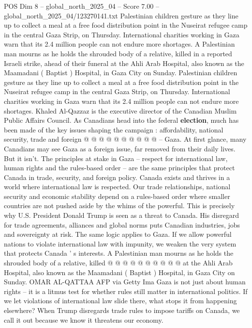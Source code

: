 \begin{textsample}{POS Dim 8 – global\_north\_2025\_04 – Score 7.00 – global\_north\_2025\_04/123270141.txt}  \label{ex:f8_pos_375}
Palestinian children gesture as they line up to collect a meal at a free food distribution point in the Nuseirat refugee camp in the central Gaza Strip, on Thursday.
International charities working in Gaza warn that its 2.4 million people can not endure more shortages.
A Palestinian man mourns as he holds the shrouded body of a relative, killed in a reported Israeli strike, ahead of their funeral at the Ahli Arab Hospital, also known as the Maamadani ( Baptist ) Hospital, in Gaza City on Sunday.
Palestinian children gesture as they line up to collect a meal at a free food distribution point in the Nuseirat refugee camp in the central Gaza Strip, on Thursday.
International charities working in Gaza warn that its 2.4 million people can not endure more shortages.
Khaled Al-Qazzaz is the executive director of the Canadian Muslim Public Affairs Council.
As Canadians head into the federal \textbf{election}, much has been made of the key issues shaping the campaign : affordability, national security, trade and foreign @ @ @ @ @ @ @ @ @ @ -- Gaza.
At first glance, many Canadians may see Gaza as a foreign issue, far removed from their daily lives.
But it isn't.
The principles at stake in Gaza -- respect for international law, human rights and the rules-based order -- are the same principles that protect Canada in trade, security, and foreign policy.
Canada exists and thrives in a world where international law is respected.
Our trade relationships, national security and economic stability depend on a rules-based order where smaller countries are not pushed aside by the whims of the powerful.
This is precisely why U.S.
President Donald Trump is seen as a threat to Canada.
His disregard for trade agreements, alliances and global norms puts Canadian industries, jobs and sovereignty at risk.
The same logic applies to Gaza.
If we allow powerful nations to violate international law with impunity, we weaken the very system that protects Canada ' s interests.
A Palestinian man mourns as he holds the shrouded body of a relative, killed @ @ @ @ @ @ @ @ @ @ at the Ahli Arab Hospital, also known as the Maamadani ( Baptist ) Hospital, in Gaza City on Sunday.
OMAR AL-QATTAA AFP via Getty Ima Gaza is not just about human rights -- it is a litmus test for whether rules still matter in international politics.
If we let violations of international law slide there, what stops it from happening elsewhere?
When Trump disregards trade rules to impose tariffs on Canada, we call it out because we know it threatens our economy.

\end{textsample}
